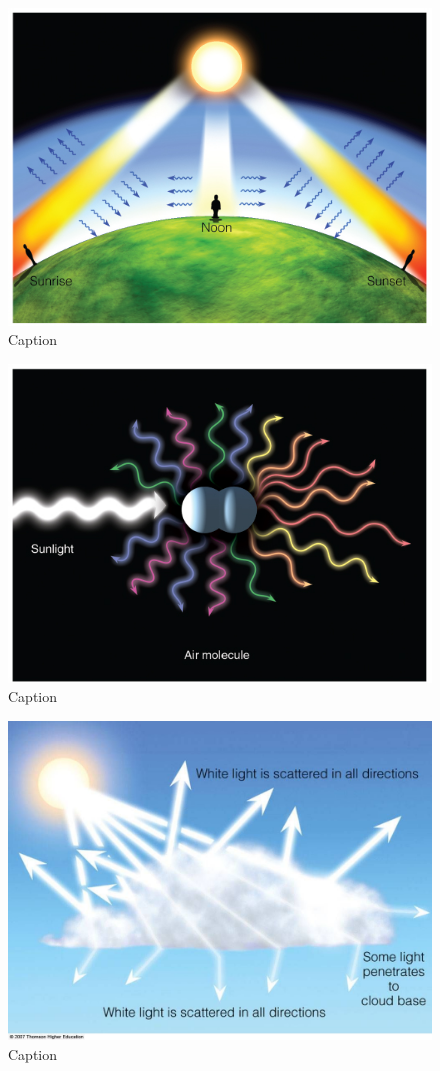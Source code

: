\documentclass[12pt,oneside]{book}
\begin{document}
\begin{figure}

{\centering \includegraphics[width=0.5\linewidth]{figures/Figure124} 

}

\caption{Caption}\label{fig:Scattering}
\end{figure}

\begin{figure}

{\centering \includegraphics[width=0.5\linewidth]{figures/Figure125} 

}

\caption{Caption}\label{fig:Scattering2}
\end{figure}

\begin{figure}

{\centering \includegraphics[width=0.5\linewidth]{figures/Figure126} 

}

\caption{Caption}\label{fig:Scattering3}
\end{figure}
\end{document}
